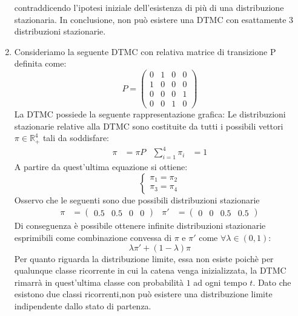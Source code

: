 \documentclass[
	12pt, %
]{fphw}
\begin{document}
\begin{enumerate}
	contraddicendo l'ipotesi iniziale dell'esistenza di più di una distribuzione stazionaria.
	In conclusione, non può esistere una DTMC con esattamente $3$ distribuzioni stazionarie.
	\item Consideriamo la seguente DTMC con relativa matrice di transizione P definita come:
	\begin{equation*}
		P = \begin{pmatrix}
			0 & 1 & 0 & 0\\
			1 & 0 & 0 & 0\\
			0 & 0 & 0 & 1\\
			0 & 0 & 1 & 0
		\end{pmatrix}
	\end{equation*}
	La DTMC possiede la seguente rappresentazione grafica:
	Le distribuzioni stazionarie relative alla DTMC sono costituite da tutti i possibili vettori $\pi \in \mathbb{R}_+ ^4$ tali da soddisfare:
	\begin{align*}
	\pi &= \pi P & \sum_{i = 1}^{4} \pi_i &= 1 
	\end{align*}
	A partire da quest'ultima equazione si ottiene:
	\begin{equation*}
		\begin{cases} 
			\pi_1 = \pi_2\\
			\pi_3 = \pi_4
		\end{cases}
	\end{equation*}
	Osservo che le seguenti sono due possibili distribuzioni stazionarie
	\begin{align*}
		\pi &= \begin{pmatrix}
			0.5 & 0.5 & 0 & 0 
		\end{pmatrix} & 
		\pi' &= \begin{pmatrix}
			0 & 0 & 0.5 & 0.5 
		\end{pmatrix}
	\end{align*}
	Di conseguenza è possibile ottenere infinite distribuzioni stazionarie
	esprimibili come combinazione convessa di $\pi$ e $\pi'$ come $\forall \lambda \in (0,1)$:
	\begin{equation*}
		\lambda \pi' + (1-\lambda ) \pi 
	\end{equation*}
	Per quanto riguarda la distribuzione limite, essa non esiste poichè per qualunque classe ricorrente
	in cui la catena venga inizializzata, la DTMC rimarrà in quest'ultima classe con probabilità $1$ ad ogni tempo $t$.
	Dato che esistono due classi ricorrenti,non può esistere una distribuzione limite indipendente dallo stato di partenza.


\end{enumerate}
\end{document}
